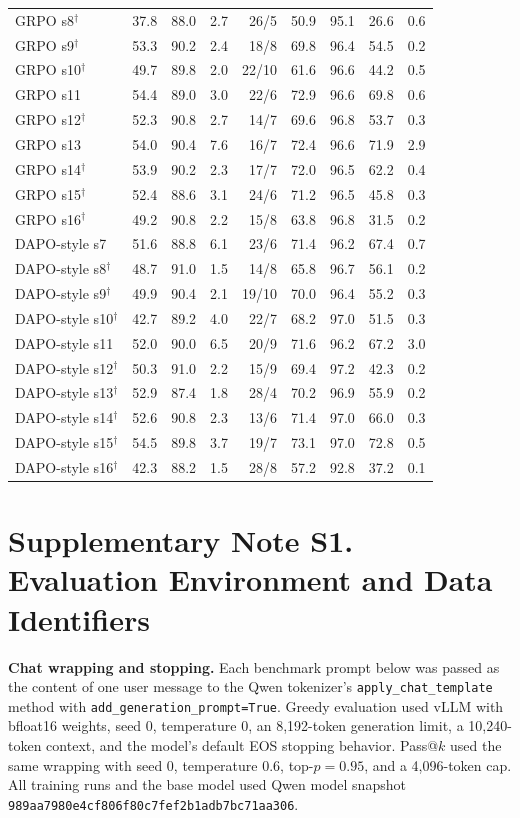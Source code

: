 \documentclass[11pt]{article}
\begin{document}
\begin{table}[p]
{\begin{tabular}{lrrrrrrrr}
GRPO s8$^\dagger$ & 37.8 & 88.0 & 2.7 & 26/5 & 50.9 & 95.1 & 26.6 & 0.6 \\
GRPO s9$^\dagger$ & 53.3 & 90.2 & 2.4 & 18/8 & 69.8 & 96.4 & 54.5 & 0.2 \\
GRPO s10$^\dagger$ & 49.7 & 89.8 & 2.0 & 22/10 & 61.6 & 96.6 & 44.2 & 0.5 \\
GRPO s11 & 54.4 & 89.0 & 3.0 & 22/6 & 72.9 & 96.6 & 69.8 & 0.6 \\
GRPO s12$^\dagger$ & 52.3 & 90.8 & 2.7 & 14/7 & 69.6 & 96.8 & 53.7 & 0.3 \\
GRPO s13 & 54.0 & 90.4 & 7.6 & 16/7 & 72.4 & 96.6 & 71.9 & 2.9 \\
GRPO s14$^\dagger$ & 53.9 & 90.2 & 2.3 & 17/7 & 72.0 & 96.5 & 62.2 & 0.4 \\
GRPO s15$^\dagger$ & 52.4 & 88.6 & 3.1 & 24/6 & 71.2 & 96.5 & 45.8 & 0.3 \\
GRPO s16$^\dagger$ & 49.2 & 90.8 & 2.2 & 15/8 & 63.8 & 96.8 & 31.5 & 0.2 \\
\midrule
DAPO-style s7 & 51.6 & 88.8 & 6.1 & 23/6 & 71.4 & 96.2 & 67.4 & 0.7 \\
DAPO-style s8$^\dagger$ & 48.7 & 91.0 & 1.5 & 14/8 & 65.8 & 96.7 & 56.1 & 0.2 \\
DAPO-style s9$^\dagger$ & 49.9 & 90.4 & 2.1 & 19/10 & 70.0 & 96.4 & 55.2 & 0.3 \\
DAPO-style s10$^\dagger$ & 42.7 & 89.2 & 4.0 & 22/7 & 68.2 & 97.0 & 51.5 & 0.3 \\
DAPO-style s11 & 52.0 & 90.0 & 6.5 & 20/9 & 71.6 & 96.2 & 67.2 & 3.0 \\
DAPO-style s12$^\dagger$ & 50.3 & 91.0 & 2.2 & 15/9 & 69.4 & 97.2 & 42.3 & 0.2 \\
DAPO-style s13$^\dagger$ & 52.9 & 87.4 & 1.8 & 28/4 & 70.2 & 96.9 & 55.9 & 0.2 \\
DAPO-style s14$^\dagger$ & 52.6 & 90.8 & 2.3 & 13/6 & 71.4 & 97.0 & 66.0 & 0.3 \\
DAPO-style s15$^\dagger$ & 54.5 & 89.8 & 3.7 & 19/7 & 73.1 & 97.0 & 72.8 & 0.5 \\
DAPO-style s16$^\dagger$ & 42.3 & 88.2 & 1.5 & 28/8 & 57.2 & 92.8 & 37.2 & 0.1 \\
\bottomrule
\end{tabular}}
\end{table}


\clearpage
\section*{Supplementary Note S1. Evaluation Environment and Data Identifiers}
\noindent\textbf{Chat wrapping and stopping.} Each benchmark prompt below was passed as the content of one user message to the Qwen tokenizer's
\texttt{apply\_chat\_template} method with \texttt{add\_generation\_prompt=True}. Greedy evaluation used
vLLM with bfloat16 weights, seed 0, temperature 0, an 8,192-token generation limit, a 10,240-token context,
and the model's default EOS stopping behavior. Pass@$k$ used the same wrapping with seed 0, temperature
0.6, top-$p=0.95$, and a 4,096-token cap. All training runs and the base model used Qwen model snapshot
\texttt{989aa7980e4cf806f80c7fef2b1adb7bc71aa306}.
\end{document}
